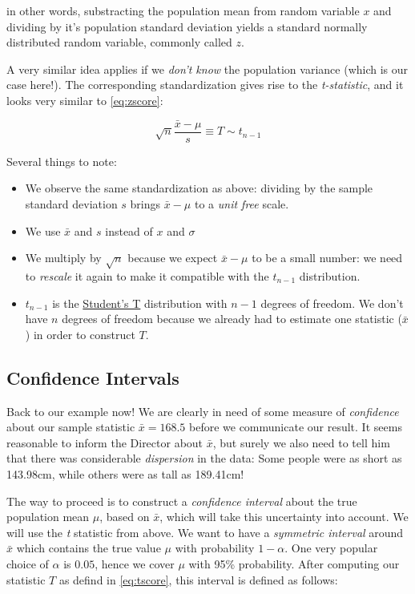 \documentclass[]{book}
\providecommand{\tightlist}{%
  \setlength{\itemsep}{0pt}\setlength{\parskip}{0pt}}
\begin{document}
in other words, substracting the population mean from random variable
\(x\) and dividing by it's population standard deviation yields a
standard normally distributed random variable, commonly called \(z\).

A very similar idea applies if we \emph{don't know} the population
variance (which is our case here!). The corresponding standardization
gives rise to the \emph{t-statistic}, and it looks very similar to
\eqref{eq:zscore}:

\begin{equation}
\sqrt{n} \frac{\bar{x} - \mu}{s} \equiv T \sim t_{n-1} \label{eq:tscore}
\end{equation}

Several things to note:

\begin{itemize}
\tightlist
\item
  We observe the same standardization as above: dividing by the sample
  standard deviation \(s\) brings \(\bar{x} - \mu\) to a \emph{unit
  free} scale.
\item
  We use \(\bar{x}\) and \(s\) instead of \(x\) and \(\sigma\)
\item
  We multiply by \(\sqrt{n}\) because we expect \(\bar{x} - \mu\) to be
  a small number: we need to \emph{rescale} it again to make it
  compatible with the \(t_{n-1}\) distribution.
\item
  \(t_{n-1}\) is the
  \href{https://en.wikipedia.org/wiki/Student's_t-distribution}{Student's
  T} distribution with \(n-1\) degrees of freedom. We don't have \(n\)
  degrees of freedom because we already had to estimate one statistic
  (\(\bar{x}\)) in order to construct \(T\).
\end{itemize}

\subsection{Confidence Intervals}\label{CI}

Back to our example now! We are clearly in need of some measure of
\emph{confidence} about our sample statistic \(\bar{x} = 168.5\) before
we communicate our result. It seems reasonable to inform the Director
about \(\bar{x}\), but surely we also need to tell him that there was
considerable \emph{dispersion} in the data: Some people were as short as
143.98cm, while others were as tall as 189.41cm!

The way to proceed is to construct a \emph{confidence interval} about
the true population mean \(\mu\), based on \(\bar{x}\), which will take
this uncertainty into account. We will use the \emph{t} statistic from
above. We want to have a \emph{symmetric interval} around \(\bar{x}\)
which contains the true value \(\mu\) with probability \(1-\alpha\). One
very popular choice of \(\alpha\) is \(0.05\), hence we cover \(\mu\)
with 95\% probability. After computing our statistic \(T\) as defind in
\eqref{eq:tscore}, this interval is defined as follows:
\end{document}
